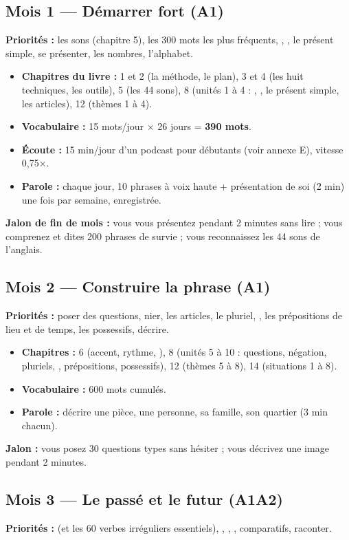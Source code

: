\subsection{Mois 1 --- Démarrer fort (A1)}
\textbf{Priorités :} les sons (chapitre 5), les 300 mots les plus fréquents, ,
, le présent simple, se présenter, les nombres, l'alphabet.

\begin{itemize}
  \item \textbf{Chapitres du livre :} 1 et 2 (la méthode, le plan), 3 et 4 (les huit techniques, les outils), 5 (les 44 sons), 8 (unités 1 à 4 : , , le présent simple, les articles), 12 (thèmes 1 à 4).
  \item \textbf{Vocabulaire :} 15 mots/jour $\times$ 26 jours = \textbf{390 mots}.
  \item \textbf{Écoute :} 15 min/jour d'un podcast pour débutants (voir annexe E), vitesse 0,75×.
  \item \textbf{Parole :} chaque jour, 10 phrases à voix haute + présentation de soi
  (2 min) une fois par semaine, enregistrée.
\end{itemize}
\textbf{Jalon de fin de mois :} vous vous présentez pendant 2 minutes sans lire ;
vous comprenez et dites 200 phrases de survie ; vous reconnaissez les 44 sons de l'anglais.

\subsection{Mois 2 --- Construire la phrase (A1)}
\textbf{Priorités :} poser des questions, nier, les articles, le pluriel, ,
les prépositions de lieu et de temps, les possessifs, décrire.

\begin{itemize}
  \item \textbf{Chapitres :} 6 (accent, rythme, ), 8 (unités 5 à 10 : questions, négation, pluriels, , prépositions, possessifs), 12 (thèmes 5 à 8), 14 (situations 1 à 8).
  \item \textbf{Vocabulaire :} 600 mots cumulés.
  \item \textbf{Parole :} décrire une pièce, une personne, sa famille, son quartier (3 min chacun).
\end{itemize}
\textbf{Jalon :} vous posez 30 questions types sans hésiter ; vous décrivez une image
pendant 2 minutes.

\subsection{Mois 3 --- Le passé et le futur (A1\ra A2)}
\textbf{Priorités :}  (et les 60 verbes irréguliers essentiels),
, , , comparatifs, raconter.

